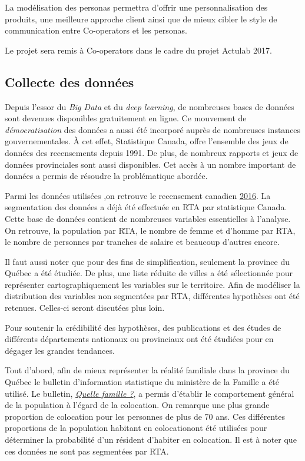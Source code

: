 \documentclass[11pt,french]{article}\usepackage[]{graphicx}\usepackage[]{color}
\begin{document}
La modélisation des personas permettra d'offrir une personnalisation des produits, une meilleure approche client ainsi que de mieux cibler le style de communication entre Co-operators et les personas.

Le projet sera remis à Co-operators dans le cadre du projet Actulab 2017.

\subsection{Collecte des données}

Depuis l'essor du \emph{Big Data} et du \emph{deep learning}, de nombreuses bases de données sont devenues disponibles gratuitement en ligne. Ce mouvement de \emph{démocratisation} des données a aussi été incorporé auprès de nombreuses instances gouvernementales. À cet effet, Statistique Canada, offre l'ensemble des jeux de données des recensements depuis 1991. De plus, de nombreux rapports et jeux de données provinciales sont aussi disponibles. Cet accès à un nombre important de données a permis de résoudre la problématique abordée.
\newline

Parmi les données utilisées ,on retrouve le recensement canadien \href{http://www12.statcan.gc.ca/census-recensement/2016/dp-pd/prof/details/download-telecharger/comp/page_dl-tc.cfm?Lang=F}{2016}.  La segmentation des données a déjà été effectuée en RTA par statistique Canada. Cette base de données contient de nombreuses variables essentielles à l’analyse. On retrouve, la population par RTA, le nombre de femme et d’homme par RTA, le nombre de personnes par tranches de salaire et beaucoup d’autres encore.
\newline

Il faut aussi noter que pour des fins de simplification, seulement la province du Québec a été étudiée. De plus, une liste réduite de villes a été sélectionnée pour représenter cartographiquement les variables sur le territoire. Afin de modéliser la distribution des variables non segmentées par RTA, différentes hypothèses ont été retenues. Celles-ci seront discutées plus loin. 
\newline

Pour soutenir la crédibilité des hypothèses, des publications et des études de différents départements nationaux ou provinciaux ont été étudiées pour en dégager les grandes tendances. 
\newline

Tout d'abord, afin de mieux représenter la réalité familiale dans la province du Québec le bulletin d'information statistique du ministère de la Famille a été utilisé. Le bulletin, \href{https://www.mfa.gouv.qc.ca/fr/Famille/chiffres-famille-quebec/bulletin_quelle_famille/Pages/aut2013_no1_tab4.aspx}{\emph{Quelle famille ?}}, a permis d'établir le comportement général de la population à l'égard de la colocation. On remarque une plus grande proportion de colocation pour les personnes de plus de 70 ans. Ces différentes proportions de la population habitant en colocationont été utilisées pour déterminer la probabilité d'un résident d'habiter en colocation. Il est à noter que ces données ne sont pas segmentées par RTA.
\newline
\end{document}
